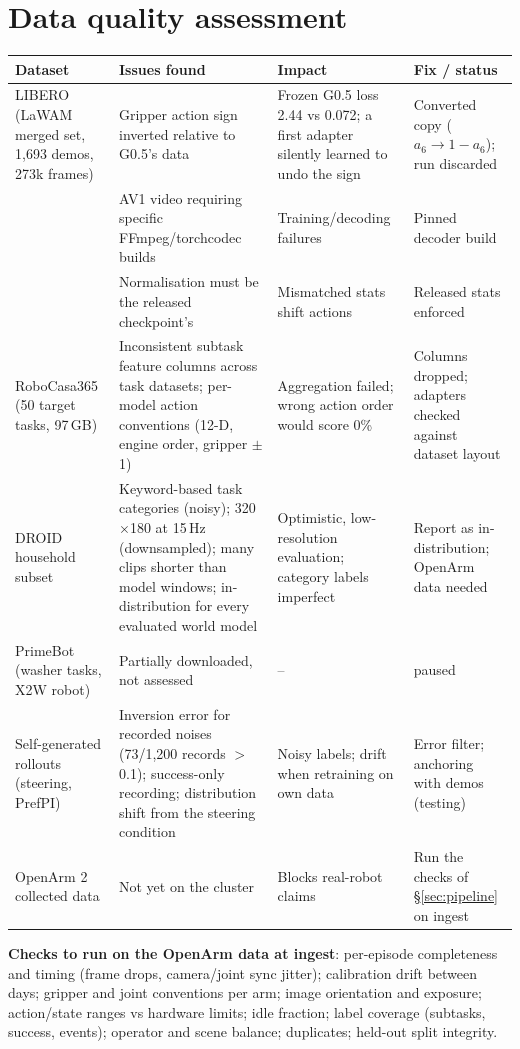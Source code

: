 \documentclass[10pt,a4paper]{article}
\begin{document}
\section{Data quality assessment}
\label{sec:dataq}
\begin{small}
\begin{longtable}{@{}P{2.7cm}P{5.6cm}P{3.8cm}P{3.2cm}@{}}
\toprule
\textbf{Dataset} & \textbf{Issues found} & \textbf{Impact} & \textbf{Fix / status} \\
\midrule\endhead
LIBERO (LaWAM merged set, 1,693 demos, 273k frames) & Gripper action sign inverted relative to G0.5's data & Frozen G0.5 loss 2.44 vs 0.072; a first adapter silently learned to undo the sign & Converted copy ($a_6\rightarrow1-a_6$); run discarded \\
& AV1 video requiring specific FFmpeg/torchcodec builds & Training/decoding failures & Pinned decoder build \\
& Normalisation must be the released checkpoint's & Mismatched stats shift actions & Released stats enforced \\
RoboCasa365 (50 target tasks, 97\,GB) & Inconsistent subtask feature columns across task datasets; per-model action conventions (12-D, engine order, gripper $\pm$1) & Aggregation failed; wrong action order would score 0\% & Columns dropped; adapters checked against dataset layout \\
DROID household subset & Keyword-based task categories (noisy); 320$\times$180 at 15\,Hz (downsampled); many clips shorter than model windows; in-distribution for every evaluated world model & Optimistic, low-resolution evaluation; category labels imperfect & Report as in-distribution; OpenArm data needed \\
PrimeBot (washer tasks, X2W robot) & Partially downloaded, not assessed & -- & paused \\
Self-generated rollouts (steering, PrefPI) & Inversion error for recorded noises (73/1,200 records $>$0.1); success-only recording; distribution shift from the steering condition & Noisy labels; drift when retraining on own data & Error filter; anchoring with demos (testing) \\
OpenArm 2 collected data & Not yet on the cluster & Blocks real-robot claims & Run the checks of \S\ref{sec:pipeline} on ingest \\
\bottomrule
\end{longtable}
\end{small}
\noindent\textbf{Checks to run on the OpenArm data at ingest}: per-episode completeness and timing (frame drops, camera/joint sync jitter); calibration drift between days; gripper and joint conventions per arm; image orientation and exposure; action/state ranges vs hardware limits; idle fraction; label coverage (subtasks, success, events); operator and scene balance; duplicates; held-out split integrity.
\end{document}
